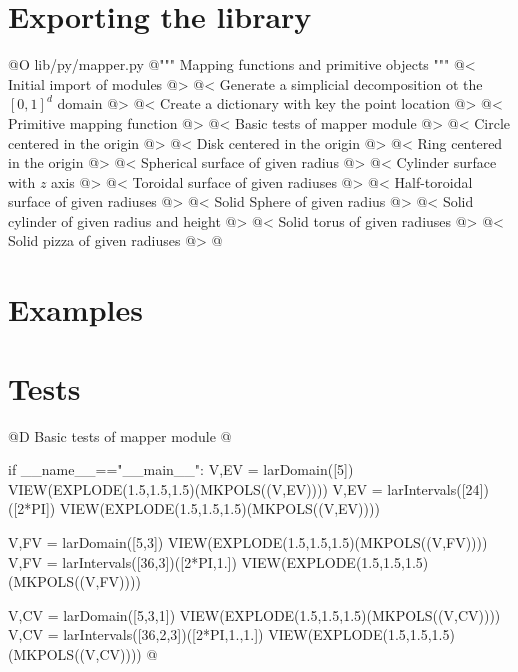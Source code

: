 \documentclass[11pt,oneside]{article}	%
\begin{document}
\section{Exporting the library}
@O lib/py/mapper.py
@{""" Mapping functions and primitive objects """
@< Initial import of modules @>
@< Generate a simplicial decomposition ot the $[0,1]^d$ domain @>
@< Create a dictionary with key the point location @>
@< Primitive mapping function @>
@< Basic tests of mapper module @>
@< Circle centered in the origin @>
@< Disk centered in the origin @>
@< Ring centered in the origin @>
@< Spherical surface of given radius @>
@< Cylinder surface with $z$ axis @>
@< Toroidal surface of given radiuses @>
@< Half-toroidal surface of given radiuses @>
@< Solid Sphere of given radius @>
@< Solid cylinder of given radius and height @>
@< Solid torus of given radiuses @>
@< Solid pizza of given radiuses @>
@}
\section{Examples}
\section{Tests}

	
@D Basic tests of mapper module
@{if __name__=="__main__":
	V,EV = larDomain([5])
	VIEW(EXPLODE(1.5,1.5,1.5)(MKPOLS((V,EV))))
	V,EV = larIntervals([24])([2*PI])
	VIEW(EXPLODE(1.5,1.5,1.5)(MKPOLS((V,EV))))
		
	V,FV = larDomain([5,3])
	VIEW(EXPLODE(1.5,1.5,1.5)(MKPOLS((V,FV))))
	V,FV = larIntervals([36,3])([2*PI,1.])
	VIEW(EXPLODE(1.5,1.5,1.5)(MKPOLS((V,FV))))
		
	V,CV = larDomain([5,3,1])
	VIEW(EXPLODE(1.5,1.5,1.5)(MKPOLS((V,CV))))
	V,CV = larIntervals([36,2,3])([2*PI,1.,1.])
	VIEW(EXPLODE(1.5,1.5,1.5)(MKPOLS((V,CV))))
@}
\end{document}
